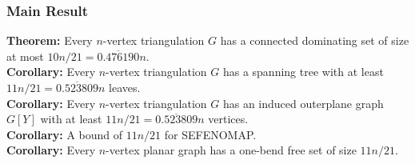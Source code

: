 \documentclass{beamer}
\begin{document}
\begin{frame}
  \frametitle{Main Result}

  \textbf{Theorem:}  Every $n$-vertex triangulation $G$ has a connected dominating set of size at most $10n/21=\overline{0.476190}n$.\\[2em]

  \textbf{Corollary:}  Every $n$-vertex triangulation $G$ has a spanning tree with at least $11n/21=\overline{0.523809}n$ leaves.\\[2em]

  \textbf{Corollary:}  Every $n$-vertex triangulation $G$ has an induced outerplane graph $G[Y]$ with at least $11n/21=\overline{0.523809}n$ vertices.\\[2em]

  \textbf{Corollary:}  A bound of $11n/21$ for SEFENOMAP.\\[2em]

  \textbf{Corollary:}  Every $n$-vertex planar graph has a one-bend free set of size $11n/21$.
\end{frame}
\end{document}
